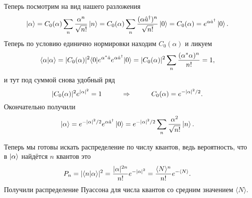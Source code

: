 Теперь посмотрим на вид нашего разложения
\begin{equation*}
	\left| \alpha \right\rangle = C_0(\alpha) \sum_n \frac{\alpha^n}{\sqrt{n!}} \left| n \right\rangle = C_0(\alpha) \sum_n \frac{(\alpha \hat{a}^\dagger)^n}{\sqrt{n!}} \left| 0 \right\rangle = C_0(\alpha) = e^{\alpha \hat{a}^\dagger} \left| 0 \right\rangle.
\end{equation*}
Теперь по условию единично нормировки находим $C_0(\alpha)$ и ликуем
\begin{equation*}
	\bk{\alpha}{\alpha} = |C_0(\alpha)|^2 \bk{0}[e^{\alpha^* \hat{a}} e^{\alpha \hat{a}^\dagger}]{0}
	=
	|C_0(\alpha)|^2 \sum_n \frac{(\alpha^* \alpha)^n}{n!} = 1,
\end{equation*}
и тут под суммой снова удобный ряд
\begin{equation*}
	|C_0(\alpha)|^2 e^{|\alpha|^2} = 1
	\hspace{1 cm}
	\Rightarrow
	\hspace{1 cm}
	C_0(\alpha) = e^{- |\alpha|^2/2}.
\end{equation*}
Окончательно получили
\begin{equation*}
	\left| \alpha \right\rangle = e^{- |\alpha|^2/2} e^{\alpha \hat{a}^\dagger} \left| 0 \right\rangle = e^{- |\alpha|^2/2} \sum_n \frac{\alpha^2}{\sqrt{n!}} \left| n \right\rangle.
\end{equation*}

Теперь мы готовы искать распределение по числу квантов, ведь вероятность, что в $\left| \alpha \right\rangle$ найдётся $n$ квантов это
\begin{equation*}
	P_n = |\bk{n}{\alpha}|^2 = \frac{|\alpha|^{2n}}{n!} e^{- |\alpha|^2}
	=
	\frac{\langle N \rangle^n}{n!} e^{- \langle N \rangle}.
\end{equation*}
Получили распределение Пуассона для числа квантов со средним значением $\langle N \rangle$.